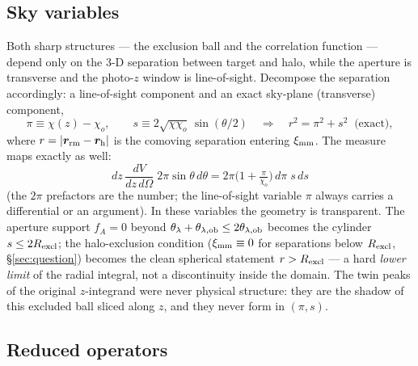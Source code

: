 \documentclass[a4paper, 11pt]{article}
\newcommand{\ximm}{\xi_{\rm mm}}
\newcommand{\Rex}{R_{\rm excl}}
\newcommand{\thob}{\theta_{\lambda,{\rm ob}}}
\begin{document}
\subsection{Sky variables}
\label{sec:sky_vars}

Both sharp structures --- the exclusion ball and the correlation
function --- depend only on the 3-D separation between target and
halo, while the aperture is transverse and the photo-$z$ window
is line-of-sight. Decompose the separation accordingly: a
line-of-sight component and an exact sky-plane (transverse)
component,
\begin{equation}
\pi \equiv \chi(z)-\chi_o,
\qquad
s \equiv 2\sqrt{\chi\chi_o}\,\sin(\theta/2)
\quad\Longrightarrow\quad
r^2 = \pi^2 + s^2 \;\;\text{(exact)},
\label{eq:sky_vars}
\end{equation}
where $r=|\bm{r}_{\rm rm}-\bm{r}_{\rm h}|$ is the comoving
separation entering $\ximm$. The measure maps exactly as well:
\begin{equation}
dz\,\frac{dV}{dz\,d\Omega}\;2\pi\sin\theta\,d\theta
= 2\pi\Big(1+\tfrac{\pi}{\chi_o}\Big)\,d\pi\;s\,ds
\label{eq:measure}
\end{equation}
(the $2\pi$ prefactors are the number; the line-of-sight variable
$\pi$ always carries a differential or an argument). In these
variables the geometry is transparent. The aperture support
$f_A=0$ beyond $\theta_\lambda+\thob\le2\thob$ becomes the
cylinder $s\le2\Rex$; the halo-exclusion condition
($\ximm\equiv0$ for separations below $\Rex$,
\S\ref{sec:question}) becomes the clean spherical statement
$r>\Rex$ --- a hard \emph{lower limit} of the radial integral,
not a discontinuity inside the domain. The twin peaks of the
original $z$-integrand were never physical structure: they are
the shadow of this excluded ball sliced along $z$, and they never
form in $(\pi,s)$.

\subsection{Reduced operators}
\label{sec:operators}
\end{document}
